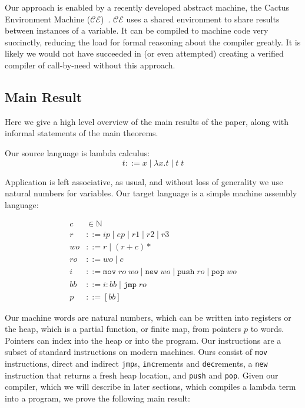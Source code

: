 Our approach is enabled by a recently developed abstract machine, the Cactus
Environment Machine ($\mathcal{CE}$)~\cite{?}. $\mathcal{CE}$ uses a shared
environment to share results between instances of a variable. It can be compiled
to machine code very succinctly, reducing the load for formal reasoning about
the compiler greatly. It is likely we would not have succeeded in (or even
attempted) creating a verified compiler of call-by-need without this approach.

\subsection{Main Result}
Here we give a high level overview of the main results of the paper, along with
informal statements of the main theorems.

Our source language is lambda calculus: 
$$ t ::= x \; | \; \lambda x.t \; | \; t \; t $$

Application is left associative, as usual, and without loss of generality we
use natural numbers for variables. Our target language is a simple machine
assembly language:

\begin{align}
  \tag{Machine Word}     c &\in \mathbb{N} \\
  \tag{Registers} r &::= ip \; | \; ep \; | \; r1 \; | \; r2 \; | \; r3 \\
  \tag{Write Operands}  wo &::= r \; | \; (r+c)* \\
  \tag{Read Operands}  ro &::= wo \; | \; c \\
  \tag{Instructions} i &::= \texttt{mov} \; ro \; wo \; 
                       | \; \texttt{new} \; wo \;
                       | \; \texttt{push} \; ro \; 
                       | \; \texttt{pop} \; wo \\
  \tag{Basic Block} bb &::= i : bb \; | \;  \texttt{jmp} \; ro \; \\
  \tag{Program}   p &::= [bb]
\end{align}

Our machine words are natural numbers, which can be written into registers or
the heap, which is a partial function, or finite map, from pointers $p$ to
words. Pointers can index into the heap or into the program. Our instructions
are a subset of standard instructions on modern machines. Ours consist of
\texttt{mov} instructions, direct and indirect \texttt{jmp}s, \texttt{inc}rements
and \texttt{dec}rements, a \texttt{new} instruction that returns a fresh heap
location, and \texttt{push} and \texttt{pop}.  Given our compiler, which we will
describe in later sections, which compiles a lambda term into a program, we
prove the following main result:

